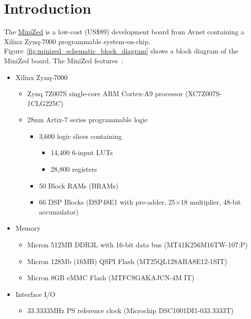 \section{Introduction}

The \href{http://www.minized.org}{MiniZed} is a low-cost (US\$89) development
board from Avnet containing a Xilinx Zynq-7000 programmable system-on-chip.
%
Figure~\ref{fig:minized_schematic_block_diagram} shows a block diagram of
the MiniZed board. The MiniZed
features~\cite{Avnet_MiniZed_HW_2017,Avnet_MiniZed_Schematic_2017}:
%
\begin{itemize}
\item Xilinx Zynq-7000
%
\begin{itemize}
\item Zynq 7Z007S single-core ARM Cortex-A9 processor (XC7Z007S-1CLG225C)
\item 28nm Artix-7 series programmable logic
\begin{itemize}
\item 3,600 logic slices containing~\cite{Xilinx_UG585_2018}
\begin{itemize}
\item 14,400 6-input LUTs
\item 28,800 registers
\end{itemize}
\item 50 Block RAMs (BRAMs)
\item 66 DSP Blocks (DSP48E1 with pre-adder, 25$\times$18 multiplier, 48-bit accumulator)
\end{itemize}
\end{itemize}
%
\item Memory
%
\begin{itemize}
\item Micron 512MB DDR3L with 16-bit data bus (MT41K256M16TW-107:P)
\item Micron 128Mb (16MB) QSPI Flash (MT25QL128ABA8E12-1SIT)
\item Micron 8GB eMMC Flash (MTFC8GAKAJCN-4M IT)
\end{itemize}
%
\item Interface I/O
%
\begin{itemize}
\item 33.3333MHz PS reference clock (Microchip DSC1001DI1-033.3333T)

\end{itemize}
\end{itemize}
